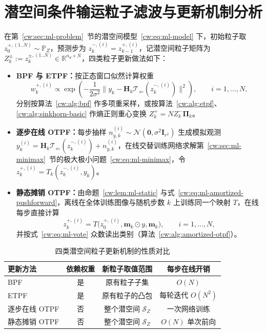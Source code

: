\section{潜空间条件输运粒子滤波与更新机制分析}\label{cw:sec:ml-updates}

在第~\ref{cw:sec:ml-problem}~节的潜空间模型~\eqref{cw:eq:ml-model} 下，初始粒子取 $z_0^{+,(1..N)}\sim\mathbb P_Z$，预测步为 $z_k^{-,(i)}=z_{k-1}^{+,(i)}$，记潜空间粒子矩阵为 $Z_k^\pm:=z_k^{\pm,(1..N)}\in\mathbb R^{n_d\times N}$，四类粒子更新做法如下：
\begin{itemize}[leftmargin=2em,topsep=3pt,itemsep=2pt,parsep=0pt]
\item \textbf{BPF 与 ETPF：}按正态窗口似然计算权重
\begin{equation}\label{cw:eq:ml-weights}
w_k^{+,(i)}\propto\exp\!\left(-\frac{1}{2\sigma^2}\bigl\|y_k-\bm H_k\mathscr T_{\Leftarrow}(z_k^{-,(i)})\bigr\|^2\right),\qquad i=1,\dots,N,
\end{equation}
分别按算法~\ref{cw:alg:bpf} 作多项重采样，或按算法~\ref{cw:alg:etpf}、\ref{cw:alg:sinkhorn-basic} 作熵正则重心变换 $Z_k^+=NZ_k^-\bm\Pi_k$。
\item \textbf{逐步在线 OTPF：}每步抽样 $n_{y,k}^{(i)}\sim\mathcal N(\bm 0,\sigma^2\bm I_{r^2})$ 生成模拟观测 $y_k^{(i)}=\bm H_k\mathscr T_{\Leftarrow}(z_k^{-,(i)})+n_{y,k}^{(i)}$\cite{aljarrah2024brenier}，在线交替训练网络求解第~\ref{cw:sec:ml-minimax}~节的极大极小问题~\eqref{cw:eq:ml-minimax}，令 $z_k^{+,(i)}=T_k(z_k^{-,(i)},y_k)$。
\item \textbf{静态摊销 OTPF：}由命题~\ref{cw:lem:ml-static} 与式~\eqref{cw:eq:ml-amortized-pushforward}，离线在全体训练图像与随机步数 $k$ 上训练同一个映射 $T$，在线每步直接计算
\begin{equation}\label{cw:eq:ml-amortized-update}
z_k^{+,(i)}=T\bigl(z_0^{+,(i)},\bm m_k\odot y,\bm m_k\bigr),\qquad i=1,\dots,N,
\end{equation}
并按式~\eqref{cw:eq:ml-vote} 众数读出类别（算法~\ref{cw:alg:amortized-otpf}）。
\end{itemize}



\begin{table}[!htb]
\centering
\caption{四类潜空间粒子更新机制的性质对比}
\label{cw:tab:ml-updates}
\vspace{0.2em}\wuhao\setlength{\tabcolsep}{6pt}
\begin{tabular}{lccc}
\toprule[1.5pt]
更新方法 & 依赖权重 & 新粒子取值范围 & 每步在线开销 \\
\midrule[1pt]
BPF & 是 & 原有粒子子集 & $O(N)$ \\
ETPF & 是 & 原有粒子的凸包 & 每轮迭代 $O(N^2)$ \\
逐步在线 OTPF & 否 & 整个潜空间 $\mathcal S_Z$ & 一次网络训练 \\
静态摊销 OTPF & 否 & 整个潜空间 $\mathcal S_Z$ & $O(N)$ 单次前向 \\
\bottomrule[1.5pt]
\end{tabular}
\end{table}

